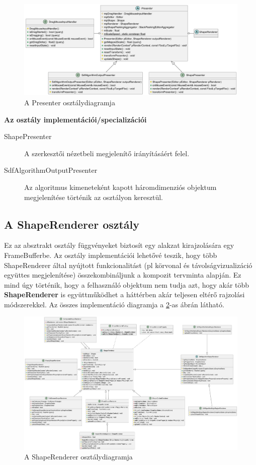 \begin{figure}[H]
	\centering
	\includegraphics[width=1\linewidth]{images/class_presenter.png}
	\caption{A Presenter osztálydiagramja}
	\label{fig:class_presenter-1}
\end{figure}

\textbf{Az osztály implementációi/specializációi}

\begin{description}
	\item[ShapePresenter] A szerkesztői nézetbeli megjelenítő irányításáért felel.
	\item[SdfAlgorithmOutputPresenter] Az algoritmus kimeneteként kapott háromdimenziós objektum megjelenítése történik az osztályon keresztül.
\end{description}

\subsection{A ShapeRenderer osztály}

Ez az absztrakt osztály függvényeket biztosít egy alakzat kirajzolására egy FrameBufferbe. Az osztály implementációi lehetővé teszik, hogy több ShapeRenderer által nyújtott funkcionalitást (pl körvonal és távolságvizualizáció együttes megjelenítése) összekombináljunk a kompozit tervminta alapján. Ez mind úgy történik, hogy a felhasználó objektum nem tudja azt, hogy akár több \textbf{ShapeRenderer} is együttműködhet a háttérben akár teljesen eltérő rajzolási módszerekkel. Az összes implementáció diagramja a \ref{fig:class_shape_renderer-1}-as ábrán látható.

\begin{figure}[H]
	\centering
	\includegraphics[width=1\linewidth]{images/class_shape_renderer.png}
	\caption{A ShapeRenderer osztálydiagramja}
	\label{fig:class_shape_renderer-1}
\end{figure}

